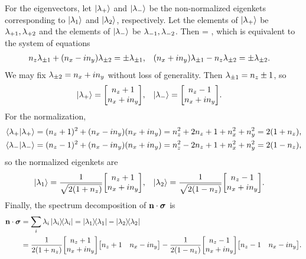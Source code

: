 \begin{solution}
	For the eigenvectors, let $\ket{\lambda_+}$ and $\ket{\lambda_-}$ be the non-normalized eigenkets corresponding to $\ket{\lambda_1}$ and $\ket{\lambda_2}$, respectively.  Let the elements of $\ket{\lambda_+}$ be $\lambda_{+1}, \lambda_{+2}$ and the elements of $\ket{\lambda_-}$ be $\lambda_{-1}, \lambda_{-2}$.  Then
	\beq
		\mqty[ \nz & \nx - i \ny \\ \nx + i \ny & -\nz ] \mqty[ \lampmq \\ \lampmw ] = \pm \mqty[ \lampmq \\ \lampmw ],
	\eeq
	which is equivalent to the system of equations
	\begin{align*}
		n_z \lambda_{\pm1} + (n_x - i n_y) \lambda_{\pm2} &= \pm\lambda_{\pm1}, &
		(n_x + i n_y) \lambda_{\pm1} - n_z \lambda_{\pm2} &= \pm\lambda_{\pm2}.
	\end{align*}
	We may fix $\lambda_{\pm2} = n_x + i n_y$ without loss of generality.  Then $\lambda_{\pm1} = n_z \pm 1$, so
	\begin{align*}
		\klamp &= \mqty[ \nz + 1 \\ \nx + i \ny ], &
		\klamm &= \mqty[ \nz - 1 \\ \nx + i \ny ].
	\end{align*}
	For the normalization,
	\begin{align*}
		\braket{\lambda_+} &= (n_z + 1)^2 + (n_x - i n_y)(n_x + i n_y)
		= n_z^2 + 2 n_z + 1 + n_x^2 + n_y^2
		= 2 (1 + n_z), \\
		\braket{\lambda_-} &= (n_z - 1)^2 + (n_x - i n_y)(n_x + i n_y)
		= n_z^2 - 2 n_z + 1 + n_x^2 + n_y^2
		= 2 (1 - n_z),
	\end{align*}
	so the normalized eigenkets are
	\begin{align*}
		\klamq &= \frac{1}{\sqrt{2 (1 + \nz)}} \mqty[ \nz + 1 \\ \nx + i \ny ], &
		\klamw &= \frac{1}{\sqrt{2 (1 - \nz)}} \mqty[ \nz - 1 \\ \nx + i \ny ].
	\end{align*}
	Finally, the spectrum decomposition of $\mathbf{n} \cdot \boldsymbol{\sigma}$ is
	\begin{align}
		\nds &= \sum_{i} \lam_i \ketbra{\lam_i}
		= \ketbra{\lamq} - \ketbra{\lamw} \notag \\
		&= \frac{1}{2 (1 + \nz)} \mqty[ \nz + 1 \\ \nx + i \ny ] \mqty[ \nz + 1 & \nx - i \ny ] - \frac{1}{2 (1 - \nz)} \mqty[ \nz - 1 \\ \nx + i \ny ] \mqty[ \nz - 1 & \nx - i \ny ]. \label{spec}
	\end{align}
\vfix
\end{solution}

\newcommand{\alp}{\alpha}
\newcommand{\eiands}{e^{i \alp \nds}}
\newcommand{\sumni}{\sum_{n = 0}^\infty}
\newcommand{\sina}{\sin{\alp}}
\newcommand{\cosa}{\cos{\alp}}

